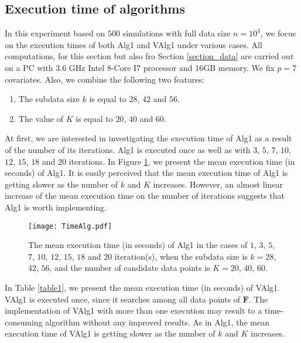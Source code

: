 \documentclass[12pt]{article}
\theoremstyle{definition}
\begin{document}
	\subsection{\label{time} Execution time of algorithms}
	In this experiment based on $500$ simulations with full data size $n=10^3$, we focus on the execution times of both Alg1 and VAlg1 under various cases. All
	computations, for this section but also fro Section \ref{section_data} are carried out on a PC with 3.6 GHz Intel 8-Core I7
	processor and 16GB memory. We fix $p=7$ covariates. Also, we combine the following two features:
	\begin{enumerate}
		\item The subdata size $k$ is equal to $28$, $42$ and $56$.
		\item The value of $K$ is equal to $20$, $40$ and $60$.
	\end{enumerate} 
	
	At first, we are interested in investigating the execution time of Alg1 as a result of the number of its iterations. Alg1 is executed once as well as with $3$, $5$, $7$, $10$, $12$, $15$, $18$ and $20$ iterations. In Figure \ref{fig2}, we present the mean execution time (in seconds) of Alg1. It is easily perceived that the mean execution time of Alg1 is getting slower as the number of $k$ and $K$ increases. However, an almost linear increase of the mean execution time on the number of iterations suggests that Alg1 is worth implementing.
	
	\begin{figure}[!thb]
		\centering
		\texttt{[image: TimeAlg.pdf]}
		\caption{The mean execution time (in seconds) of Alg1 in the cases of $1$, $3$, $5$, $7$, $10$, $12$, $15$, $18$ and $20$ iteration(s), when the subdata size is $k=28$, $42$, $56$, and the number of candidate data points is $K=20$, $40$, $60$.}
		\label{fig2}
	\end{figure}
	
	In Table \ref{table1}, we present the mean execution time (in seconds) of VAlg1. VAlg1 is executed once, since it searches among all data points of $\textbf{F}$. The implementation of VAlg1 with more than one execution may result to a time-consuming algorithm without any improved results. As in Alg1, the mean execution time of VAlg1 is getting slower as the number of $k$ and $K$ increases.
	
\end{document}
